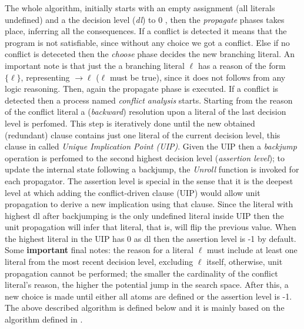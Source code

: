 The whole algorithm, initially starts with an empty assignment (all literals undefined)
and a the decision level (\textit{dl}) to 0  ,
then the \textit{propagate} phases takes place, inferring all the consequences.
If a conflict is detected it means that the program is not satisfiable, since 
without any choice we got a conflict.
Else if no conflict is deteceted then the \textit{choose} phase decides the new branching literal.
An important note is that just the a branching literal $\ell$ has a reason of the form $\{\ell\}$, representing
$\rightarrow \ell$ ($\ell$ must be true), since it 
does not follows from any logic reasoning.
Then, again the propagate phase is executed.
If a conflict is detected then a process named \textit{conflict analysis} starts.
Starting from the reason of the conflict literal a (\textit{backward}) resolution upon a literal of the last
decision level is perfomed. This step is iteratively done until the new obtained (redundant) clause 
contains just one literal of the current decision level, this clause in called
\textit{Unique Implication Point (UIP)}.
Given the UIP then a \textit{backjump} operation is perfomed to the second highest decision level
(\textit{assertion level}); to update the internal state following a backjump, the \textit{Unroll}
function is invoked for each propagator.
The assertion level is special in the sense that it is the deepest level
at which adding the conﬂict-driven clause (UIP) would allow unit propagation to derive
a new implication using that clause. Since the literal with highest dl after backjumping 
is the only undefined literal inside UIP then the unit propagation will infer that literal,
that is, will flip the previous value.
When the highest literal in the UIP has 0 as dl then the assertion level is -1 by default.
Some \textbf{important} final notes: the reason for a literal $\ell$
must include at least one literal from the most recent decision level, excluding $\ell$
itself, otherwise, unit propagation 
cannot be performed; the smaller the cardinality of the conflict literal's reason, 
the higher the potential jump in the search space.
After this, a new choice is made until either all atoms are defined or the
assertion level is -1.
The above described algorithm is defined below and it is mainly based on the algorithm 
defined in \cite{DBLP:series/faia/SilvaLM09}.
